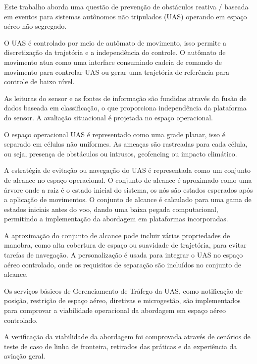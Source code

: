 \noindent Este trabalho aborda uma questão de prevenção de obstáculos reativa / baseada em eventos para sistemas autônomos não tripulados (UAS) operando em espaço aéreo não-segregado.

O UAS é controlado por meio de autômato de movimento, isso permite a discretização da trajetória e a independência do controle. O autômato de movimento atua como uma interface consumindo cadeia de comando de movimento para controlar UAS ou gerar uma trajetória de referência para controle de baixo nível.

As leituras do sensor e as fontes de informação são fundidas através da fusão de dados baseada em classificação, o que proporciona independência da plataforma do sensor. A avaliação situacional é projetada no espaço operacional.

O espaço operacional UAS é representado como uma grade planar, isso é separado em células não uniformes. As ameaças são rastreadas para cada célula, ou seja, presença de obstáculos ou intrusos, geofencing ou impacto climático.

A estratégia de evitação ou navegação do UAS é representada como um conjunto de alcance no espaço operacional. O conjunto de alcance é aproximado como uma árvore onde a raiz é o estado inicial do sistema, os nós são estados esperados após a aplicação de movimentos. O conjunto de alcance é calculado para uma gama de estados iniciais antes do voo, dando uma baixa pegada computacional, permitindo a implementação da abordagem em plataformas incorporadas.

A aproximação do conjunto de alcance pode incluir várias propriedades de manobra, como alta cobertura de espaço ou suavidade de trajetória, para evitar tarefas de navegação. A personalização é usada para integrar o UAS no espaço aéreo controlado, onde os requisitos de separação são incluídos no conjunto de alcance.

Os serviços básicos de Gerenciamento de Tráfego da UAS, como notificação de posição, restrição de espaço aéreo, diretivas e microgestão, são implementados para comprovar a viabilidade operacional da abordagem em espaço aéreo controlado.

A verificação da viabilidade da abordagem foi comprovada através de cenários de teste de caso de linha de fronteira, retirados das práticas e da experiência da aviação geral. 